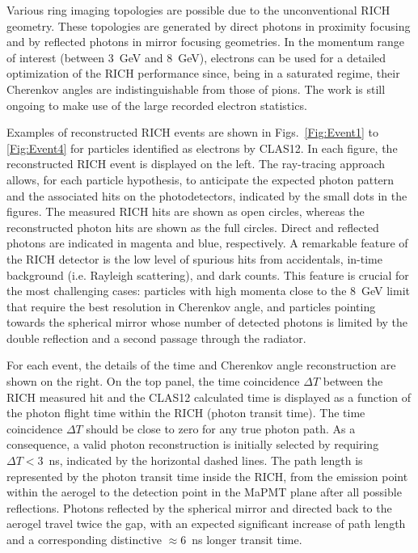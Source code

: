 \documentclass[5p,times,twocolumn]{elsarticle}
\begin{document}
Various ring imaging topologies are possible due to the  unconventional RICH geometry. These topologies are generated
by direct photons in proximity focusing and by reflected photons in mirror focusing geometries. In the momentum
range of interest (between 3~GeV and 8~GeV), electrons can be used for a detailed optimization of the RICH
performance since, being in a saturated regime, their Cherenkov angles are indistinguishable from those of pions.
The work is still ongoing to make use of the large recorded electron statistics.

Examples of reconstructed RICH events are shown in Figs.~\ref{Fig:Event1} to \ref{Fig:Event4} for particles
identified as electrons by CLAS12. In each figure, the reconstructed RICH event is displayed on the left. The
ray-tracing approach allows, for each particle hypothesis, to anticipate the expected photon pattern and the associated
hits on the photodetectors, indicated by the small dots in the figures.
The measured RICH hits are shown as open circles, whereas the reconstructed photon hits are shown as the full
circles. Direct and reflected photons are indicated in magenta and blue, respectively. A remarkable feature of the
RICH detector is the low level of spurious hits from accidentals, in-time background (i.e. Rayleigh scattering), and
dark counts. This feature is crucial for the most challenging cases: particles with high momenta close to the 8~GeV
limit that require the best resolution in Cherenkov angle, and particles pointing towards the spherical mirror whose
number of detected photons is limited by the double reflection and a second passage through the radiator. 

For each event, the details of the time and Cherenkov angle reconstruction are shown on the right. On the top panel,
the time coincidence $\Delta T$ between the RICH measured hit and the CLAS12 calculated time is displayed as a
function of the photon flight time within the RICH (photon transit time). The time coincidence $\Delta T$ should be
close to zero for any true photon path. As a consequence, a valid photon reconstruction is initially selected by
requiring $\Delta T<3$~ns, indicated by the horizontal dashed lines. The path length is represented by the photon
transit time inside the RICH, from the emission point within the aerogel to the detection point in the MaPMT plane
after all possible reflections. Photons reflected by the spherical mirror and directed back to the aerogel travel
twice the gap, with an expected significant increase of path length and a corresponding distinctive $\approx$6~ns
longer transit time. %
\end{document}
